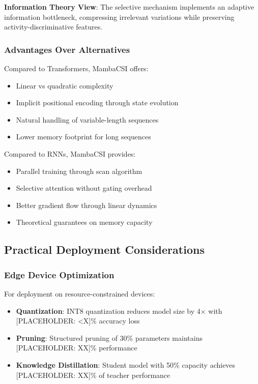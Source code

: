 \documentclass[journal]{IEEEtran}
\begin{document}
\textbf{Information Theory View}: The selective mechanism implements an adaptive information bottleneck, compressing irrelevant variations while preserving activity-discriminative features.

\subsubsection{Advantages Over Alternatives}

Compared to Transformers, MambaCSI offers:
\begin{itemize}
\item Linear vs quadratic complexity
\item Implicit positional encoding through state evolution
\item Natural handling of variable-length sequences
\item Lower memory footprint for long sequences
\end{itemize}

Compared to RNNs, MambaCSI provides:
\begin{itemize}
\item Parallel training through scan algorithm
\item Selective attention without gating overhead
\item Better gradient flow through linear dynamics
\item Theoretical guarantees on memory capacity
\end{itemize}

\subsection{Practical Deployment Considerations}

\subsubsection{Edge Device Optimization}
For deployment on resource-constrained devices:
\begin{itemize}
\item \textbf{Quantization}: INT8 quantization reduces model size by 4× with [PLACEHOLDER: <X]\% accuracy loss
\item \textbf{Pruning}: Structured pruning of 30\% parameters maintains [PLACEHOLDER: XX]\% performance
\item \textbf{Knowledge Distillation}: Student model with 50\% capacity achieves [PLACEHOLDER: XX]\% of teacher performance
\end{itemize}
\end{document}
